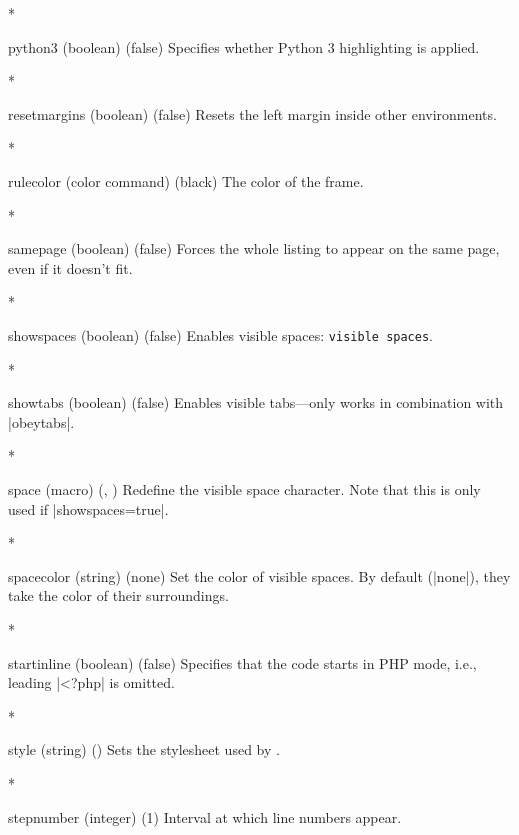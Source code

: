 \begin{paracol}{2}
\begin{optionlist}
\switchcolumn[0]*%
  \item[python3 (boolean) (false)] 
    Specifies whether Python 3 highlighting is applied.
    \switchcolumn

\switchcolumn[0]*%
  \item[resetmargins (boolean) (false)]
    Resets the left margin inside other environments.
    \switchcolumn

\switchcolumn[0]*%
  \item[rulecolor (color command) (black)]
    The color of the frame.
    \switchcolumn

\switchcolumn[0]*%
  \item[samepage (boolean) (false)]
    Forces the whole listing to appear on the same page, even if it doesn't fit.
    \switchcolumn

\switchcolumn[0]*%
  \item[showspaces (boolean) (false)]
    Enables visible spaces: \verb*/visible spaces/.
    \switchcolumn

\switchcolumn[0]*%
  \item[showtabs (boolean) (false)]
    Enables visible tabs---only works in combination with |obeytabs|.
    \switchcolumn

    \switchcolumn[0]*%

\item[space (macro) (\string\textvisiblespace, \textvisiblespace)]
Redefine the visible space character.  Note that this is only used if |showspaces=true|.
\switchcolumn

\switchcolumn[0]*%

\item[spacecolor (string) (none)]
Set the color of visible spaces.  By default (|none|), they take the color of their surroundings.
\switchcolumn

\switchcolumn[0]*%

  \item[startinline (boolean) (false)] 
    Specifies that the code starts in PHP mode, i.e., leading |<?php| is omitted.
    \switchcolumn

\switchcolumn[0]*%
  \item[style] (string) ()
    Sets the stylesheet used by .
    \switchcolumn

\switchcolumn[0]*%
  \item[stepnumber (integer) (1)]
    Interval at which line numbers appear.
    \switchcolumn


\end{optionlist}
\end{paracol}
